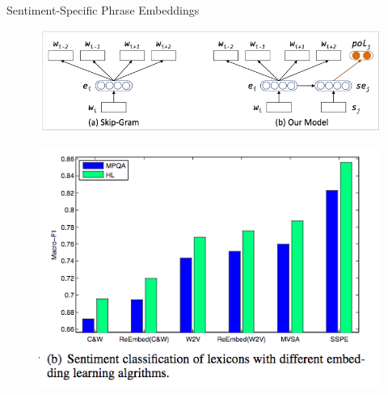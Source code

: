 \begin{frame}{Sentiment-Specific Phrase Embeddings}


  \begin{figure}[h]
        	\includegraphics[scale = 0.4]{pics/SSPE.png}
        \end{figure}

  \begin{figure}[h]
        	\includegraphics[scale = 0.3]{pics/SSPERes.png}
        \end{figure}


\end{frame}






